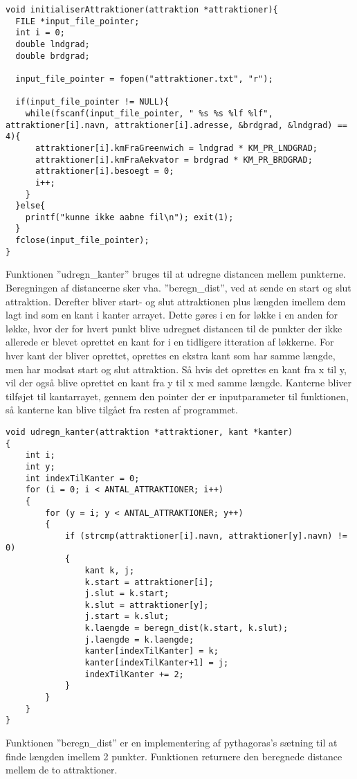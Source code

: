 \begin{lstlisting}
void initialiserAttraktioner(attraktion *attraktioner){
  FILE *input_file_pointer;
  int i = 0;
  double lndgrad;
  double brdgrad;

  input_file_pointer = fopen("attraktioner.txt", "r");

  if(input_file_pointer != NULL){
    while(fscanf(input_file_pointer, " %s %s %lf %lf", attraktioner[i].navn, attraktioner[i].adresse, &brdgrad, &lndgrad) == 4){
      attraktioner[i].kmFraGreenwich = lndgrad * KM_PR_LNDGRAD;
      attraktioner[i].kmFraAekvator = brdgrad * KM_PR_BRDGRAD;
      attraktioner[i].besoegt = 0;
      i++;
    }
  }else{
    printf("kunne ikke aabne fil\n"); exit(1);
  }
  fclose(input_file_pointer);
} 
\end{lstlisting}

Funktionen ”udregn\_kanter” bruges til at udregne distancen mellem punkterne. Beregningen af distancerne sker vha. ”beregn\_dist”, ved at sende en start og slut attraktion. Derefter bliver start- og slut attraktionen plus længden imellem dem lagt ind som en kant i kanter arrayet. Dette gøres i en for løkke i en anden for løkke, hvor der for hvert punkt blive udregnet distancen til de punkter der ikke allerede er blevet oprettet en kant for i en tidligere itteration af løkkerne. For hver kant der bliver oprettet, oprettes en ekstra kant som har samme længde, men har modsat start og slut attraktion. Så hvis det oprettes en kant fra x til y, vil der også blive oprettet en kant fra y til x med samme længde. Kanterne bliver tilføjet til kantarrayet, gennem den pointer der er inputparameter til funktionen, så kanterne kan blive tilgået fra resten af programmet. 

\begin{lstlisting}
void udregn_kanter(attraktion *attraktioner, kant *kanter)
{
	int i;
	int y;
	int indexTilKanter = 0;
	for (i = 0; i < ANTAL_ATTRAKTIONER; i++)
	{
		for (y = i; y < ANTAL_ATTRAKTIONER; y++)
		{
			if (strcmp(attraktioner[i].navn, attraktioner[y].navn) != 0)
			{
				kant k, j;
				k.start = attraktioner[i];
				j.slut = k.start;
				k.slut = attraktioner[y];
				j.start = k.slut;
				k.laengde = beregn_dist(k.start, k.slut);
				j.laengde = k.laengde;
				kanter[indexTilKanter] = k;
				kanter[indexTilKanter+1] = j;
				indexTilKanter += 2;
			}
		}
	}
}
\end{lstlisting}

Funktionen ”beregn\_dist” er en implementering af pythagoras's sætning til at finde længden imellem 2 punkter. Funktionen returnere den beregnede distance mellem de to attraktioner.

